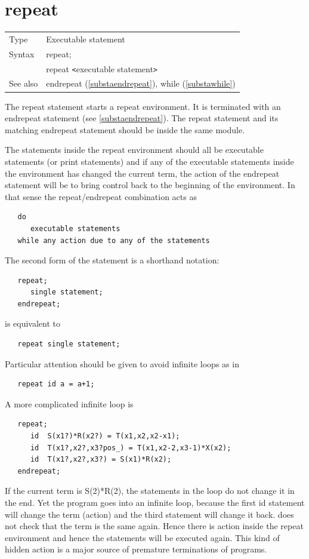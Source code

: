 
\section{repeat}
\label{substarepeat}

\noindent \begin{tabular}{ll}
Type & Executable statement\\
Syntax & repeat; \\
       & repeat {\tt<}executable statement{\tt>}
\\ See also & endrepeat (\ref{substaendrepeat}), while (\ref{substawhile})
\end{tabular} \vspace{4mm}

\noindent The repeat statement starts a
repeat environment. It is terminated with an 
endrepeat statement (see \ref{substaendrepeat}). The 
repeat statement and its matching endrepeat statement should be inside the 
same module. \vspace{4mm}

\noindent The statements inside the repeat environment should all be 
executable statements (or print statements) and if any of the executable 
statements inside the environment has changed the current term, the action 
of the endrepeat statement will be to bring control back to the beginning 
of the environment. In that sense the repeat/endrepeat combination acts as
\begin{verbatim}
   do
      executable statements
   while any action due to any of the statements
\end{verbatim}
The second form of the statement is a shorthand notation:
\begin{verbatim}
   repeat;
      single statement;
   endrepeat;
\end{verbatim}
is equivalent to
\begin{verbatim}
   repeat single statement;
\end{verbatim}
Particular attention should be given to avoid infinite 
loops as in
\begin{verbatim}
   repeat id a = a+1;
\end{verbatim}
A more complicated infinite loop is
\begin{verbatim}
   repeat;
      id  S(x1?)*R(x2?) = T(x1,x2,x2-x1);
      id  T(x1?,x2?,x3?pos_) = T(x1,x2-2,x3-1)*X(x2);
      id  T(x1?,x2?,x3?) = S(x1)*R(x2);
   endrepeat;
\end{verbatim}
If the current term is S(2)*R(2), the statements in the loop do not change 
it in the end. Yet the program goes into an infinite loop, because the 
first id statement will change the term (action) and the third statement 
will change it back. {\FORM} does not check that the term is the same 
again. Hence there is action inside the repeat environment and hence the 
statements will be executed again. This kind of hidden action is a major 
source of premature 
terminations of {\FORM} programs. \vspace{4mm}

